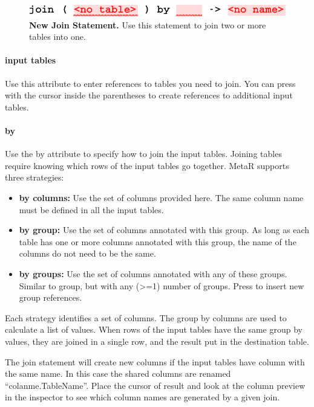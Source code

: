\begin{figure}
  \centering
  \includegraphics[width=\figWidthNarrow]{figures/NewJoinStatement.pdf}
\caption[New Join Statement.]{\textbf{New Join Statement.} Use this statement to join two or more tables into one.}
\label{fig:NewJoinStatement}
\end{figure}

\paragraph{input tables}
Use this attribute to enter references to tables you need to join. You can press \keys{\return} with the cursor inside the parentheses to create references to additional input tables.
\paragraph{by}
Use the by attribute to specify how to join the input tables. Joining tables require knowing which rows of the input tables go together. MetaR supports three strategies:
\begin{itemize}
	\item \textbf{by columns:} Use the set of columns provided here. The same column name must be defined in all the input tables.
	\item \textbf{by group:} Use the set of columns annotated with this group. As long as each table has one or more columns annotated with this group, the name of the columns do not need to be the same. 
	\item \textbf{by groups:} Use the set of columns annotated with any of these groups. Similar to group, but with any (>=1) number of groups. Press \keys{\return} to insert new group references.
\end{itemize}

Each strategy identifies a set of columns. The group by columns are used to calculate a list of values. When rows of the input tables have the same group by values, they are joined in a single row, and the result put in the destination table. 

\begin{remark}
The join statement will create new columns if the input tables have column with the same name. In this case the shared columns are renamed ``colanme.TableName''. Place the cursor of result and look at the column preview in the inspector to see which column names are generated by a given join.
\end{remark}

